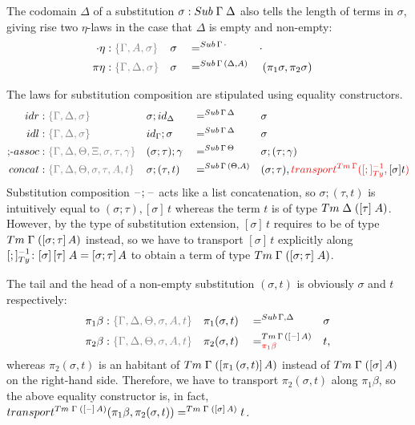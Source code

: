 \documentclass[a4paper,UKenglish,numberwithinsect,cleveref,thm-restate]{lipics-v2021}
\begin{document}
The codomain $\Delta$ of a substitution $\sigma:\Sub\;\Gamma\;\Delta$ also tells the length of terms in $\sigma$, giving rise two $\eta$-laws in the case that $\Delta$ is empty and non-empty:
\begin{alignat*}{5}
  \emptyctx\eta   & : \implicit{\Gamma, A, \sigma} && \sigma        && =^{\Sub\,\Gamma\,\emptyctx} & \emptysub \\
  \pi\eta         & : \implicit{\Gamma, \Delta, \sigma} && \sigma   && =^{\Sub\,\Gamma\,(\Delta, A)} &&  (\pi_1 \sigma, \pi_2 \sigma)
\end{alignat*}

The laws for substitution composition are stipulated using equality constructors.
\begin{alignat*}{5}
  \mathsf{idr}    & : \implicit{\Gamma, \Delta, \sigma} && {\sigma ; \idS_{\Delta}} && =^{\Sub\,\Gamma\,\Delta} && {\sigma} \\
  \mathsf{idl}    & : \implicit{\Gamma, \Delta, \sigma} && {\idS_{\Gamma} ; \sigma} && =^{\Sub\,\Gamma\,\Delta} && {\sigma} \\
  \text{;-}\mathsf{assoc} & : \implicit{\Gamma, \Delta, \Theta, \Xi, \sigma, \tau, \gamma} && (\sigma ; \tau) ; \gamma && =^{\Sub\,\Gamma\,\Theta} &&  \sigma ; (\tau ; \gamma) \\
  \mathsf{concat} & : \implicit{\Gamma, \Delta, \Theta, \sigma, \tau, A, t} && \sigma ; (\tau , t)      && =^{\Sub\,\Gamma\,(\Theta, A)} &&  (\sigma ; \tau) , \alert{\transfib{\Tm\,\Gamma}{[;]_{\Ty}^{-1}}{\color{black}[ \sigma ] t}}
\end{alignat*}
Substitution composition $\mathord{\hspace{1pt}\text{--}\hspace{1pt}};\mathord{\hspace{1pt}\text{--}\hspace{1pt}}$ acts like a list concatenation, so $\sigma; (\tau, t)$ is intuitively equal to $(\sigma; \tau), [\sigma]\,t$ whereas the term $t$ is of type $\Tm\;\Delta\;([\tau]\;A)$. 
However, by the type of substitution extension, $[\sigma]\,t$ requires to be of type $\Tm\;\Gamma\;([\sigma; \tau]\,A)$ instead, so we have to transport $[\sigma]\,t$ explicitly along $[;]_{\Ty}^{-1}\colon [\sigma]\,[\tau]\;A = [\sigma;\tau]\,A$ to obtain a term of type $\Tm\;\Gamma\;([\sigma;\tau]\;A)$.

The tail and the head of a non-empty substitution $(\sigma, t)$ is obviously $\sigma$ and $t$ respectively:
\begin{alignat*}{5}
  \pi_1\beta      & : \implicit{\Gamma, \Delta, \Theta, \sigma, A, t} && \pi_1(\sigma , t)        && =^{\Sub\,\Gamma,\Delta} &&  \sigma \\
  \pi_2\beta      & : \implicit{\Gamma, \Delta, \Theta, \sigma, A, t} && \pi_2(\sigma , t)        && =^{\Tm\,\Gamma\,([\blank]\,A)}_{\alert{\pi_1\beta}} &&  t, 
\end{alignat*}
whereas $\pi_2(\sigma, t)$ is an habitant of $\Tm\;\Gamma\;([\pi_1\,(\sigma, t)]\,A)$ instead of $\Tm\;\Gamma\;([\sigma]\,A)$ on the right-hand side. 
Therefore, we have to transport $\pi_2(\sigma, t)$ along $\pi_1\beta$, so the above equality constructor is, in fact, $\transfib{\Tm\;\Gamma\;([\blank]\,A)}{\pi_1\beta}{\pi_2(\sigma, t)} =^{\Tm\;\Gamma\;([\sigma]\,A)} t$.
\end{document}
